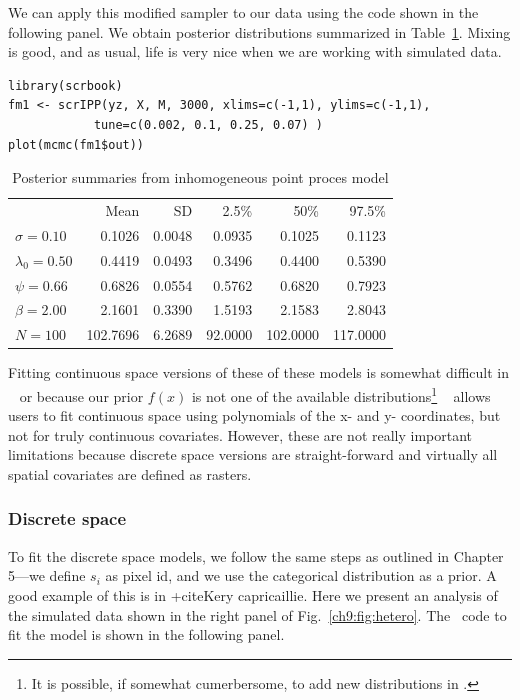 We can apply this modified sampler to our data using the code shown in
the following panel. We obtain posterior
distributions summarized in Table~\ref{ch9:tab:simIPP}. Mixing is good, and as usual,
life is very nice when we are working with simulated data.

\begin{verbatim}
library(scrbook)
fm1 <- scrIPP(yz, X, M, 3000, xlims=c(-1,1), ylims=c(-1,1),
            tune=c(0.002, 0.1, 0.25, 0.07) )
plot(mcmc(fm1$out))
\end{verbatim}


\begin{table}[h]
\centering
\caption{Posterior summaries from inhomogeneous point proces model}
\begin{tabular}{lrrrrr}
\hline
& Mean & SD & 2.5\% & 50\% & 97.5\% \\
 $\sigma =0.10$ &   0.1026 &   0.0048 &   0.0935 &   0.1025 &   0.1123 \\
 $\lambda_0=0.50$ &   0.4419 &   0.0493 &   0.3496 &   0.4400 &   0.5390 \\
 $\psi =0.66$ &   0.6826 &   0.0554 &   0.5762 &   0.6820 &   0.7923 \\
 $\beta =2.00$ &   2.1601 &   0.3390 &   1.5193 &   2.1583 &   2.8043 \\
 $N =100$ & 102.7696 &   6.2689 &  92.0000 & 102.0000 & 117.0000 \\
\hline
\end{tabular}
\label{ch9:tab:simIPP}
\end{table}


Fitting continuous space versions of these of these models is somewhat
difficult in \bugs~ or because our prior $f(x)$ is not one of the
available distributions\footnote{It is possible, if somewhat
  cumerbersome, to add new distributions in \bugs.} \secr~ allows
users to fit continuous space using polynomials of the x- and y-
coordinates, but not for truly continuous covariates. However, these
are not really important limitations because discrete
space versions are straight-forward and virtually all spatial
covariates are defined as rasters.


\subsubsection{Discrete space}


To fit the discrete space models, we follow the same steps
as outlined in Chapter 5---we define $s_i$ as
pixel id, and we use the categorical distribution as a prior. A good
example of this is in +cite{Kery capricaillie}. Here we present
an analysis of the simulated data shown in the right panel of
Fig.~\ref{ch9:fig:hetero}. The \jags~code to fit the model is shown in
the following panel.





